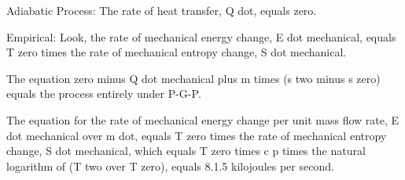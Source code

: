 Adiabatic Process: The rate of heat transfer, Q dot, equals zero.

Empirical: Look, the rate of mechanical energy change, E dot mechanical, equals T zero times the rate of mechanical entropy change, S dot mechanical.

The equation zero minus Q dot mechanical plus m times (s two minus s zero) equals the process entirely under P-G-P.

The equation for the rate of mechanical energy change per unit mass flow rate, E dot mechanical over m dot, equals T zero times the rate of mechanical entropy change, S dot mechanical, which equals T zero times c p times the natural logarithm of (T two over T zero), equals 8.1.5 kilojoules per second.